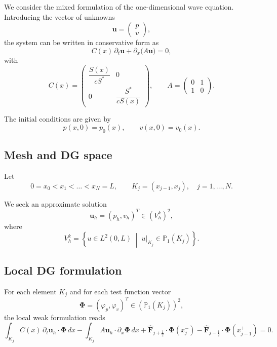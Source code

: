 \documentclass[11pt,a4paper]{report}
\theoremstyle{plain}
\theoremstyle{definition}
\begin{document}
We consider the mixed formulation of the one-dimensional wave equation.
Introducing the vector of unknowns
\begin{equation}
\mathbf{u} =
\begin{pmatrix}
p \\
v
\end{pmatrix},
\end{equation}
the system can be written in conservative form as
\begin{equation}
C(x)\, \partial_t \mathbf{u} + \partial_x \big( A \mathbf{u} \big) = 0,
\label{eq:conservative_form}
\end{equation}
with
\begin{equation}
C(x) =
\begin{pmatrix}
\dfrac{S(x)}{c S^*} & 0 \\
0 & \dfrac{S^*}{c S(x)}
\end{pmatrix},
\qquad
A =
\begin{pmatrix}
0 & 1 \\
1 & 0
\end{pmatrix}.
\end{equation}

The initial conditions are given by
\begin{equation}
p(x,0) = p_0(x), \qquad v(x,0) = v_0(x).
\end{equation}

\subsection{Mesh and DG space}

Let
\begin{equation}
0 = x_0 < x_1 < \dots < x_N = L,
\qquad
K_j = (x_{j-1}, x_j), \quad j = 1,\dots,N.
\end{equation}

We seek an approximate solution
\begin{equation}
\mathbf{u}_h = (p_h, v_h)^T \in (V_h^k)^2,
\end{equation}
where
\begin{equation}
V_h^k =
\left\{
u \in L^2(0,L) \;\middle|\;
u|_{K_j} \in \mathbb{P}_1(K_j)
\right\}.
\end{equation}

\subsection{Local DG formulation}

For each element $K_j$ and for each test function vector
\begin{equation}
\boldsymbol{\Phi} = (\varphi_p, \varphi_v)^T \in (\mathbb{P}_1(K_j))^2,
\end{equation}
the local weak formulation reads
\begin{equation}
\int_{K_j} C(x)\, \partial_t \mathbf{u}_h \cdot \boldsymbol{\Phi}\, dx
-
\int_{K_j} A \mathbf{u}_h \cdot \partial_x \boldsymbol{\Phi}\, dx
+
\widehat{\mathbf{F}}_{j+\frac12} \cdot \boldsymbol{\Phi}(x_j^-)
-
\widehat{\mathbf{F}}_{j-\frac12} \cdot \boldsymbol{\Phi}(x_{j-1}^+)
= 0.
\label{eq:dg_local_vector}
\end{equation}
\end{document}
